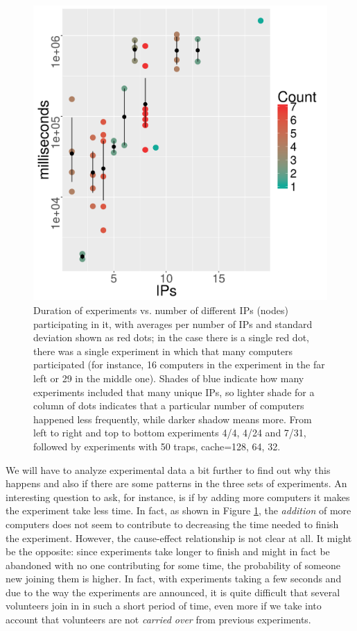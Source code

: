 \documentclass[letterpaper]{article}
\begin{document}
\begin{figure}[!htb]
\includegraphics[width=0.32\linewidth]{time-vs-ips-alife-32.png}
\caption{Duration of experiments vs. number of different IPs (nodes)
  participating in it, with averages per number of IPs and standard deviation shown as
  red dots; in the case there is a single red dot, there was a single
  experiment in which that many computers participated (for instance, 16
  computers in the experiment in the far left or 29 in the middle
  one). 
Shades of blue indicate how many experiments included that many unique IPs,
so lighter shade for a column of dots indicates that a particular number
of computers happened less frequently, while darker shadow means more. 
From left to right and top to bottom experiments 4/4, 4/24 and 7/31,
followed by experiments with 50 traps, cache=128, 64, 32.}
\label{fig:duration}
\end{figure}
%
We will have to analyze experimental data a bit further to find out why
this happens and also if there are some patterns in the three sets of
experiments. An interesting question to ask, for instance, is if 
by adding more computers it makes the experiment take less time. In fact, as
shown in Figure \ref{fig:duration}, the {\em addition} of more computers does
not seem to contribute to decreasing the time needed to finish the
experiment. However, the cause-effect relationship is not clear at
all. It might be the opposite: since experiments take longer to finish
and might in fact be abandoned with no one contributing for some time,
the probability of someone new joining them is higher. In fact,
with experiments taking a few seconds and due to the way the
experiments are announced, it is quite difficult that several
volunteers join in in such a short period of time, even more if we take
into account that volunteers are not {\em carried over} from previous
experiments. 
%
\end{document}
